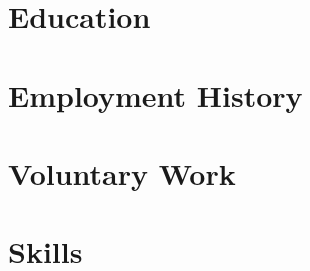 \documentclass[a4paper]{article}
\newcommand{\src}{"../../Google Drive/cv-source"}
\begin{document}




\section{Education}


\section{Employment History}


\section{Voluntary Work}


\section{Skills}


% 
\end{document}
